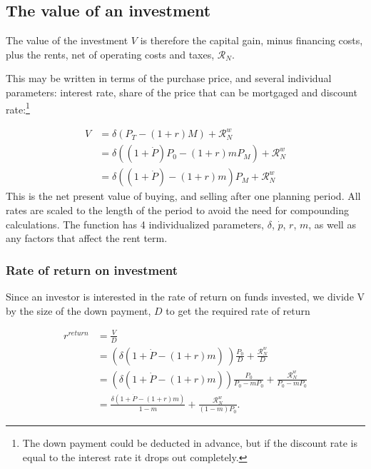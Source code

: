  \subsection{The value of an investment}
The value of the investment $V$ is therefore the capital gain, minus financing costs, plus the rents, net of operating costs and taxes, $\mathcal{R}_N$.
 
 This may be written in terms of the purchase price, and several individual parameters: interest  rate, share of the price that can be mortgaged and  discount rate:\footnote{The down payment could be deducted in advance, but if the discount rate is equal to the interest rate it drops out completely.}
 
\begin{align}
V &= \delta \left(P_T - (1+r)M\right) +   \mathcal{R}^w_N   \\
&= \delta \left((1+\dot P) P_0 - (1+r)mP_M\right)  +      \mathcal{R}^w_N \\
  &= \delta \left((1+\dot P)    - (1+r)m    \right) P_M + \mathcal{R}^w_N 
\end{align}
This is the net present value of buying, and selling after one planning period. All rates are scaled to the length of the period to avoid the need for compounding calculations. The function has 4 individualized  parameters, $\delta$, $\dot p$, $r$, $m$, as well as any factors that affect the rent term.


\subsubsection{Rate of return on investment}
Since an investor is interested in the rate of return on funds invested, we divide V by the size of the down payment, $D$ to get the required rate of return  

\begin{align}
r^{return} 
  &= \frac{V}{D}  \nonumber \\
  &= \left(\delta \left(1+\dot P - (1+r)m\right) \ \right) \frac{P_0}{D}  + \frac{\mathcal{R}^w_N }{D}      \nonumber \\
  &= \left(\delta \left(1+\dot P - (1+r)m\right)  \right) \frac{P_0}{P_0-mP_0} +  \frac{\mathcal{R}^w_N }{P_0-mP_0}  \\ 
  &= \frac{\delta \left(1+\dot P - (1+r)m\right) }{1-m} +\frac{\mathcal{R}^w_N }{(1-m)P_0}.
\label{eqn-property-investment-return1}
\end{align}


